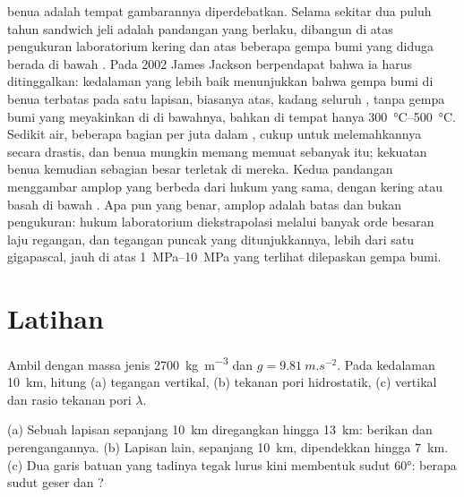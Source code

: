  benua adalah tempat gambarannya diperdebatkan. Selama sekitar dua puluh tahun sandwich jeli adalah pandangan yang berlaku, dibangun di atas pengukuran laboratorium  kering dan atas beberapa gempa bumi yang diduga berada di bawah . Pada 2002 James Jackson berpendapat bahwa ia harus ditinggalkan: kedalaman yang lebih baik menunjukkan bahwa gempa bumi di benua terbatas pada satu lapisan, biasanya  atas, kadang seluruh , tanpa gempa bumi yang meyakinkan di  di bawahnya, bahkan di tempat  hanya \qtyrange{300}{500}{\degreeCelsius}. Sedikit air, beberapa bagian per juta dalam , cukup untuk melemahkannya secara drastis, dan  benua mungkin memang memuat sebanyak itu; kekuatan benua kemudian sebagian besar terletak di  mereka. Kedua pandangan menggambar amplop yang berbeda dari hukum yang sama, dengan  kering atau basah di bawah .
Apa pun yang benar, amplop adalah batas dan bukan pengukuran: hukum laboratorium diekstrapolasi melalui banyak orde besaran laju regangan, dan tegangan puncak yang ditunjukkannya, lebih dari satu gigapascal, jauh di atas \qtyrange{1}{10}{MPa} yang terlihat dilepaskan gempa bumi.

\section{Latihan}

\begin{exercise}[$\star$]\label{exo:b1:stress-strain-rheology:1}
Ambil  dengan massa jenis \qty{2700}{kg.m^{-3}} dan $g = \qty{9.81}{m.s^{-2}}$. Pada kedalaman \qty{10}{km}, hitung (a) tegangan vertikal, (b) tekanan pori hidrostatik, (c)  vertikal dan rasio tekanan pori $\lambda$.
\end{exercise}

\begin{exercise}[$\star$]\label{exo:b1:stress-strain-rheology:2}
(a) Sebuah lapisan sepanjang \qty{10}{km} diregangkan hingga \qty{13}{km}: berikan  dan perengangannya. (b) Lapisan lain, sepanjang \qty{10}{km}, dipendekkan hingga \qty{7}{km}. (c) Dua garis batuan yang tadinya tegak lurus kini membentuk sudut \ang{60}: berapa sudut geser dan ?
\end{exercise}

